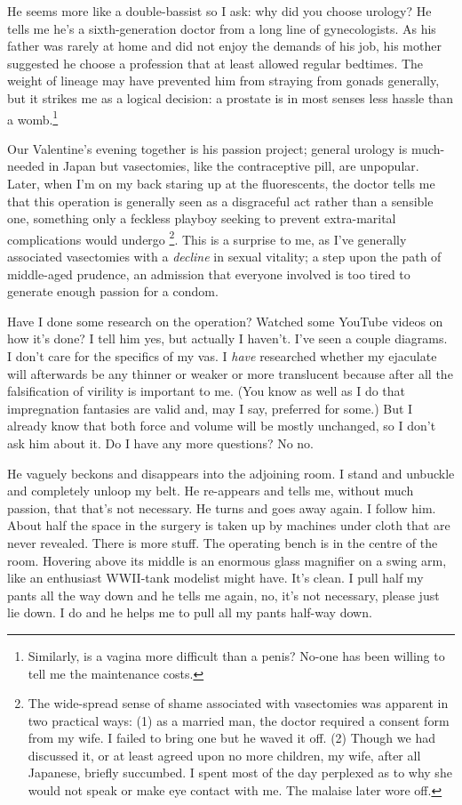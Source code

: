 \documentclass[12pt,a4paper,onecolumn]{letter}
\begin{document}
He seems more like a double-bassist so I ask: why did you choose urology? He tells me he's a sixth-generation doctor from a long line of gynecologists. As his father was rarely at home and did not enjoy the demands of his job, his mother suggested he choose a profession that at least allowed regular bedtimes. The weight of lineage may have prevented him from straying from gonads generally, but it strikes me as a logical decision: a prostate is in most senses less hassle than a womb.\footnote{Similarly, is a vagina more difficult than a penis? No-one has been willing to tell me the maintenance costs.\footnotemark}

Our Valentine's evening together is his passion project; general urology is much-needed in Japan but vasectomies, like the contraceptive pill, are unpopular. Later, when I'm on my back staring up at the fluorescents, the doctor tells me that this operation is generally seen as a disgraceful act rather than a sensible one, something only a feckless playboy seeking to prevent extra-marital complications would undergo
\footnote{The wide-spread sense of shame associated with vasectomies was apparent in two practical ways:
(1) as a married man, the doctor required a consent form from my wife. I failed to bring one but he waved it off. (2) Though we had discussed it, or at least agreed upon no more children, my wife, after all Japanese, briefly succumbed. I spent most of the day perplexed as to why she would not speak or make eye contact with me. The malaise later wore off.}. This is a surprise to me, as I've generally associated vasectomies with a {\sl decline} in sexual vitality; a step upon the path of middle-aged prudence, an admission that everyone involved is too tired to generate enough passion for a condom.

Have I done some research on the operation? Watched some YouTube videos on how it's done? I tell him yes, but actually I haven't. I've seen a couple diagrams. I don't care for the specifics of my vas. I {\sl have} researched whether my ejaculate will afterwards be any thinner or weaker or more translucent because after all the falsification of virility is important to me. (You know as well as I do that impregnation fantasies are valid and, may I say, preferred for some.) But I already know that both force and volume will be mostly unchanged, so I don't ask him about it. Do I have any more questions? No no.

He vaguely beckons and disappears into the adjoining room. I stand and unbuckle and completely unloop my belt. He re-appears and tells me, without much passion, that that's not necessary. He turns and goes away again. I follow him. About half the space in the surgery is taken up by machines under cloth that are never revealed. There is more stuff. The operating bench is in the centre of the room. Hovering above its middle is an enormous glass magnifier on a swing arm, like an enthusiast WWII-tank modelist might have. It's clean. I pull half my pants all the way down and he tells me again, no, it's not necessary, please just lie down. I do and he helps me to pull all my pants half-way down.
\end{document}
